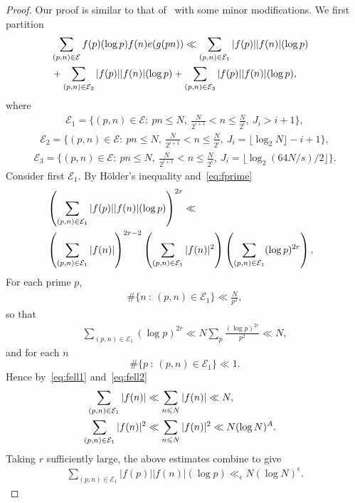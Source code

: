 \documentclass[12pt]{amsart}
\def\cE{{\mathcal E}}
\def\\{\cr}
\def\le{\leqslant}
\begin{document}
\begin{proof}

Our proof is similar to that of~\cite[Section~3]{M-V} with some minor modifications. We first partition 
\begin{align*}
& \sum_{(p,n)\in \cE}f(p)(\log{p})f(n)e(g(pn))\ll \sum_{(p,n)\in \cE_1}|f(p)||f(n)|(\log{p}) \\ &+\sum_{(p,n)\in \cE_2}|f(p)||f(n)|(\log{p})+\sum_{(p,n)\in \cE_3}|f(p)||f(n)|(\log{p}),
\end{align*}
where
\begin{align*}
\cE_1=\{ (p,n)\in \cE : ~ pn\le N, ~ \frac{N}{2^{i+1}}<n\le \frac{N}{2^{i}}, ~ J_i> i+1 \},
\end{align*}
\begin{align*}
\cE_2=\{ (p,n)\in \cE : ~ pn\le N, ~ \frac{N}{2^{i+1}}<n\le \frac{N}{2^{i}}, ~ J_i=\lfloor \log_2{N}\rfloor-i+1 \},
\end{align*}
\begin{align*}
\cE_3=\{ (p,n)\in \cE : ~ pn\le N, ~ \frac{N}{2^{i+1}}<n\le \frac{N}{2^{i}},  ~ J_i=\lfloor \log_2(64N/s)/2\rfloor \}.
\end{align*}
Consider first $\cE_1$. By H\"{o}lder's inequality and~\eqref{eq:fprime}
\begin{align*}
&\left(\sum_{(p,n)\in \cE_1}|f(p)||f(n)|(\log{p})\right)^{2r}\ll \\ & \left(\sum_{(p,n)\in \cE_1}|f(n)| \right)^{2r-2}\left(\sum_{(p,n)\in \cE_1}|f(n)|^2 \right)\left(\sum_{(p,n)\in \cE_1}(\log{p})^{2r} \right).
\end{align*}
For each prime $p$, 
\begin{align*}
\#\{ n \ : \ (p,n)\in \cE_1\} \ll \frac{N}{p^2},
\end{align*}
so that 
\begin{align*}
\sum_{(p,n)\in \cE_1}(\log{p})^{2r}\ll N\sum_{p}\frac{(\log{p})^{2r}}{p^2} \ll N,
\end{align*}
and for each $n$
$$\#\{ p \ : \ (p,n)\in \cE_1\} \ll 1.$$
Hence by~\eqref{eq:fell1} and~\eqref{eq:fell2}
\begin{align*}
\sum_{(p,n)\in \cE_1}|f(n)| &\ll \sum_{n\le N}|f(n)|\ll N, \\  \sum_{(p,n)\in \cE_1}|f(n)|^2& \ll \sum_{n\le N}|f(n)|^2\ll N(\log{N})^{A}.
\end{align*}
Taking $r$ sufficiently large, the above estimates combine to give
\begin{align*}
\sum_{(p,n)\in \cE_1}|f(p)||f(n)|(\log{p})\ll_{\epsilon} N(\log{N})^{\epsilon}.
\end{align*}

\end{proof}
\end{document}
